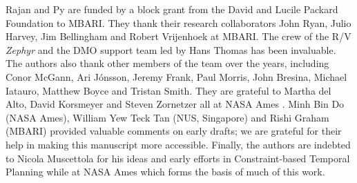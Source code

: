 \documentclass[graybox,12pt]{svmult}
\begin{document}
Rajan and Py are funded by a block grant from the David and Lucile
Packard Foundation to MBARI. They thank their research collaborators
John Ryan, Julio Harvey, Jim Bellingham and Robert Vrijenhoek at
MBARI. The crew of the R/V \emph{Zephyr} and the DMO support team led
by Hans Thomas has been invaluable. The authors also thank other
members of the \eu team over the years, including Conor McGann, Ari
J\'onsson, Jeremy Frank, Paul Morris, John Bresina, Michael Iatauro,
Matthew Boyce and Tristan Smith.  They are grateful to Martha del
Alto, David Korsmeyer and Steven Zornetzer all at NASA Ames
. Minh Bin Do (NASA Ames),
William Yew Teck Tan (NUS, Singapore) and Rishi Graham (MBARI)
provided valuable comments on early drafts; we are grateful for their
help in making this manuscript more accessible. Finally, the authors
are indebted to Nicola Muscettola  for his ideas
and early efforts in Constraint-based Temporal Planning while at NASA
Ames which forms the basis of much of this work.



\end{document}
